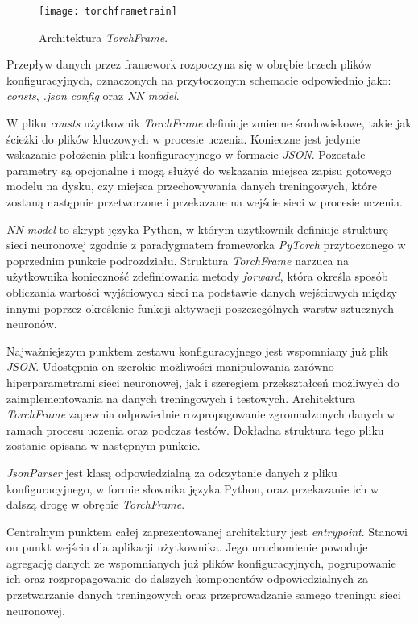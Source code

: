       \begin{figure}[h!]
        \centering
        \texttt{[image: torchframetrain]}
        \caption[Architektura \textit{TorchFrame} - źródło: Rysunek własny]{Architektura \textit{TorchFrame}.}
        \label{fig:torchframetrain}
      \end{figure}

    Przepływ danych przez framework rozpoczyna się w obrębie trzech plików konfiguracyjnych,
    oznaczonych na przytoczonym schemacie odpowiednio jako: \textit{consts}, \textit{.json config}
    oraz \textit{NN model}.

    W pliku \textit{consts} użytkownik \textit{TorchFrame} definiuje zmienne środowiskowe, takie jak
    ścieżki do plików kluczowych w procesie uczenia. Konieczne jest jedynie wskazanie
    położenia pliku konfiguracyjnego w formacie \textit{JSON}. Pozostałe parametry są opcjonalne
    i mogą służyć do wskazania miejsca zapisu gotowego modelu na dysku, czy miejsca
    przechowywania danych treningowych, które zostaną następnie przetworzone i przekazane
    na wejście sieci w procesie uczenia.

    \textit{NN model} to skrypt języka Python, w którym użytkownik definiuje strukturę sieci
    neuronowej zgodnie z paradygmatem frameworka \textit{PyTorch} przytoczonego w poprzednim
    punkcie podrozdziału. Struktura \textit{TorchFrame} narzuca na użytkownika konieczność zdefiniowania
    metody \textit{forward}, która określa sposób obliczania wartości wyjściowych sieci na podstawie danych
    wejściowych między innymi poprzez określenie funkcji aktywacji poszczególnych warstw
    sztucznych neuronów.

    Najważniejszym punktem zestawu konfiguracyjnego jest wspomniany już plik \textit{JSON}.
    Udostępnia on szerokie możliwości manipulowania zarówno hiperparametrami sieci
    neuronowej, jak i szeregiem przekształceń możliwych do zaimplementowania
    na danych treningowych i testowych. Architektura \textit{TorchFrame} zapewnia odpowiednie
    rozpropagowanie zgromadzonych danych w ramach procesu uczenia oraz podczas
    testów. Dokładna struktura tego pliku zostanie opisana w następnym punkcie.

    \textit{JsonParser} jest klasą odpowiedzialną za odczytanie danych z pliku konfiguracyjnego,
    w formie słownika języka Python, oraz przekazanie ich w dalszą drogę w obrębie \textit{TorchFrame}.

    Centralnym punktem całej zaprezentowanej architektury jest \textit{entrypoint}. Stanowi on
    punkt wejścia dla aplikacji użytkownika. Jego uruchomienie powoduje
    agregację danych ze wspomnianych już plików konfiguracyjnych, pogrupowanie ich
    oraz rozpropagowanie do dalszych komponentów odpowiedzialnych za przetwarzanie
    danych treningowych oraz przeprowadzanie samego treningu sieci neuronowej.

